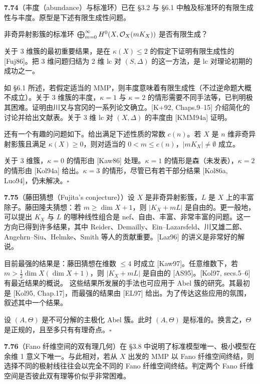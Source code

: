 \par\medskip\noindent\textbf{7.74}（丰度（abundance）与标准环）\quad 已在 §3.2 与 §6.1 中触及标准环的有限生成性与丰度。原型是下述有限生成性问题。

非奇异射影簇的标准环 $\bigoplus_{m=0}^{\infty}H^0(X,\mathcal{O}_X(mK_X))$ 是否有限生成？

关于 3 维簇的最初重要结果，是在 $\kappa(X)\le2$ 的假定下证明有限生成性的 [Fuj86]。把 3 维问题归结为 2 维 lc 对 $(S,\Delta)$ 的这一方法，是 lc 对理论初期的成功之一。

如 §6.1 所述，若假定适当的 MMP，则丰度意味着有限生成性（不过逆命题大概不成立）。关于 3 维簇的丰度，$\kappa=1$ 与 $\kappa=2$ 的情形需要不同手法等，已判明极其困难。证明由川又与宫冈的一系列论文确立。[K+92, Chaps.9--15] 介绍简化的讨论并给出文献表。关于 3 维 lc 对 $(X,\Delta)$ 的丰度由 [KMM94a] 证明。

还有一个有趣的问题如下。给出满足下述性质的常数 $c(n)$。若 $X$ 是 $n$ 维非奇异射影簇且满足 $\kappa(X)\ge0$，则对适当的 $0<m\le c(n)$，$|mK_X|\ne\emptyset$ 成立。

关于 3 维簇，$\kappa=0$ 的情形由 [Kaw86] 处理。$\kappa=1$ 的情形是森（未发表），$\kappa=2$ 的情形由 [Kol94a] 给出。$\kappa=3$ 的情形，尽管已有若干部分结果 [Kol86a, Luo94]，仍未解决。\hfill$\square$


\par\medskip\noindent\textbf{7.75}（藤田猜想（Fujita's conjecture））\quad 设 $X$ 是非奇异射影簇，$L$ 是 $X$ 上的丰富除子。藤田隆夫猜想：若 $m\ge\dim X+1$，则 $|K_X+mL|$ 是自由的。更一般地，可以提出 $K_X$ 与 $L$ 的哪种线性组合是 nef、自由、丰富、非常丰富的问题。这一方向已得到许多结果，其中 Reider、Demailly、Ein--Lazarsfeld、川又雄二郎、Angehrn--Siu、Helmke、Smith 等人的贡献重要。[Laz96] 的讲义是非常好的解说。

目前最强的结果是：藤田猜想在维数 $\le4$ 时成立 [Kaw97]。任意维数下，若 $m>\frac12\dim X(\dim X+1)$，则 $|K_X+mL|$ 是自由的 [AS95]。[Kol97, secs.5--6] 有最近结果的概说。
这些结果所发展的手法也可应用于 Abel 簇的研究。其最初是 [Kol95, Chap.17]，而最强的结果由 [EL97] 给出。为了传达这些应用的氛围，叙述其中一个结果。

设 $(A,\Theta)$ 是不可分解的主极化 Abel 簇。此时 $(A,\Theta)$ 是标准的。换言之，$\Theta$ 是正规的，且至多只有有理奇点。\hfill$\square$

\par\medskip\noindent\textbf{7.76}（Fano 纤维空间的双有理几何）\quad 在 §3.8 中说明了标准模型唯一、极小模型在余维 1 意义下唯一。与此相对，若从 $X$ 出发的 MMP 以 Fano 纤维空间终结，则选择不同的极射线往往会以完全不同的 Fano 纤维空间终结。判定两个 Fano 纤维空间是否彼此双有理等价似乎非常困难。

